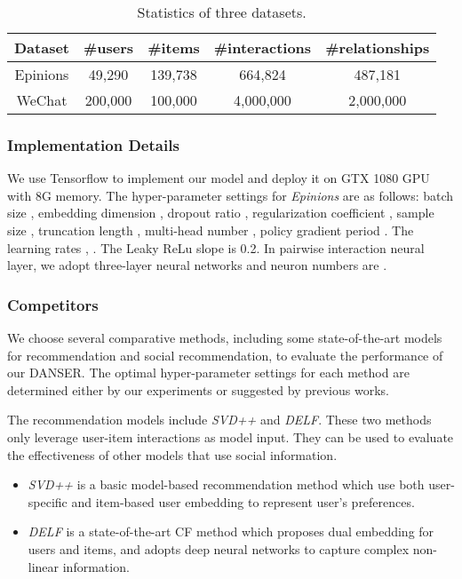 \documentclass[sigconf]{acmart}
\begin{document}
\begin{table}[h]
\setlength{\abovecaptionskip}{-0.5pt}
\setlength{\belowcaptionskip}{-5pt}
	\centering
	\small
	\caption{Statistics of three datasets.}
    \label{table-dataset}
	\begin{tabular}{ccccc}
		\toprule
		Dataset & \#users & \#items & \#interactions &\#relationships \\
		\midrule
		Epinions &49,290  & 139,738  & 664,824 &487,181    \\
		WeChat &200,000  &100,000  & 4,000,000 & 2,000,000   \\
		\bottomrule
	\end{tabular}
	\vspace{-15pt}
\end{table}

\subsubsection{Implementation Details}

We use Tensorflow to implement our model and deploy it on GTX 1080 GPU with 8G memory. The hyper-parameter settings for \emph{Epinions} are as follows: batch size , embedding dimension , dropout ratio , regularization coefficient , sample size , truncation length , multi-head number , policy gradient period . The learning rates , . The Leaky ReLu slope is 0.2. In pairwise interaction neural layer, we adopt three-layer neural networks and neuron numbers are .

\subsubsection{Competitors}

We choose several comparative methods, including some state-of-the-art models for recommendation and social recommendation, to evaluate the performance of our DANSER. The optimal hyper-parameter settings for each method are determined either by our experiments or
suggested by previous works.

The recommendation models include \emph{SVD++}\cite{SVD++} and \emph{DELF}\cite{DELF}. These two methods only leverage user-item interactions as model input. They can be used to evaluate the effectiveness of other models that use social information. 
\begin{itemize}
    \item \emph{SVD++} \cite{SVD++} is a basic model-based recommendation method which use both user-specific and item-based user embedding to represent user's preferences.
    \item \emph{DELF} \cite{DELF} is a state-of-the-art CF method which proposes dual embedding for users and items, and adopts deep neural networks to capture complex non-linear information.
\end{itemize}
 
\end{document}
